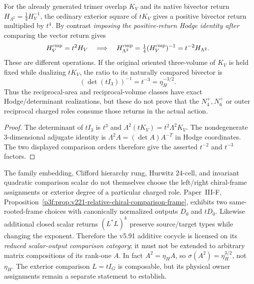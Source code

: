 \documentclass[11pt,a4paper]{article}
\begin{document}
\begin{proposition}
\label{p6:prop:v5124-hodge-order}
For the already generated trimer overlap $K_V$ and its native bivector
return $H_{\Lambda^2}=\tfrac14H_V^{-1}$, the ordinary exterior square
of $tK_V$ gives a positive bivector return multiplied by $t^4$.
By contrast \emph{imposing the positive-return Hodge identity after}
comparing the vector return gives
\[
 H_V^{\rm cmp}=t^2H_V\quad\Longrightarrow\quad
 H_{\Lambda^2}^{\rm cmp}
 =\tfrac14(H_V^{\rm cmp})^{-1}
 =t^{-2}H_{\Lambda^2}.
\]
These are different operations.  If the original oriented three-volume
of $K_V$ is held fixed while dualizing $tK_V$, the ratio to its
naturally compared bivector is
\[
 \boxed{(\det(tI_3))^{-1}=t^{-3}=\eta_H^{-3/2}.}
\]
Thus the reciprocal-area and reciprocal-volume classes have exact
Hodge/determinant realizations, but these do not prove that the
$N_4^+,N_6^+$ or outer reciprocal charged roles consume those
returns in the actual action.
\end{proposition}
\begin{proof}
The determinant of $tI_3$ is $t^3$ and
$\Lambda^2(tK_V)=t^2\Lambda^2K_V$.
The nondegenerate $3$-dimensional adjugate identity is
$\Lambda^2 A=(\det A)A^{-T}$ in Hodge coordinates.
The two displayed comparison orders therefore give the asserted
$t^{-2}$ and $t^{-3}$ factors.
\end{proof}

\begin{remark}
\label{p6:rem:v5124-physical-owner-underdetermination}
The family embedding, Clifford hierarchy rung, Hurwitz $24$-cell,
and invariant quadratic comparison scalar do not themselves
choose the left/right chiral-frame assignments or exterior degree
of a particular charged role.  Paper~III-F,
Proposition~\ref{p3f:prop:v221-relative-chiral-comparison-frame},
exhibits two same-rooted-frame choices with canonically normalized
outputs $D_0$ and $tD_0$.  Likewise additional closed scalar returns
$(L^*L)^k$ preserve source/target types while changing the exponent.
Therefore the v5.91 additive cocycle is licensed on its \emph{reduced
scalar-output comparison category}; it must not be extended to
arbitrary matrix compositions of its rank-one $A$.  In fact
$A^2=\eta_HA$, so $\sigma(A^2)=\eta_H^{3/2}$, not $\eta_H$.
The exterior comparison $L=tI_G$ is composable, but its physical
owner assignments remain a separate statement to establish.
\end{remark}
\end{document}
